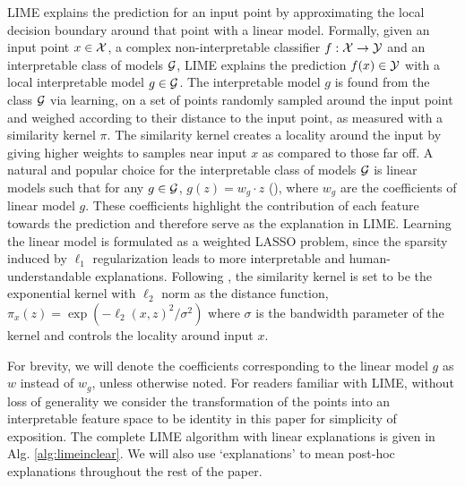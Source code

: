 LIME explains the prediction for an input point by approximating the local decision boundary around that point with a linear model. Formally, given an input point $x \in \mathcal{X}$, a complex non-interpretable classifier $f : \mathcal{X} \rightarrow \mathcal{Y}$ and an interpretable class of models $\mathcal{G}$, LIME explains the prediction $f(x) \in \mathcal{Y}$ with a local interpretable model $g \in \mathcal{G}$. The interpretable model $g$ is found from the class $\mathcal{G}$ via learning, on a set of points randomly sampled around the input point and weighed according to their distance to the input point, as measured with a similarity kernel $\pi$. The similarity kernel creates a locality around the input by giving higher weights to samples near input $x$ as compared to those far off. A natural and popular choice for the interpretable class of models $\mathcal{G}$ is linear models such that for any $g \in \mathcal{G}$, $g(z) = w_g \cdot z$ (\cite{ribeiro2016should, garreau2020looking}), where $w_g$ are the coefficients of linear model $g$. These coefficients highlight the contribution of each feature towards the prediction and therefore serve as the explanation in LIME. Learning the linear model is formulated as a weighted LASSO problem, since the sparsity induced by $\ell_1$ regularization leads to more interpretable and human-understandable explanations. Following \cite{ribeiro2016should}, the similarity kernel is set to be the exponential kernel with $\ell_2$ norm as the distance function, $\pi_x(z) = \exp \left(-\ell_2(x, z)^2 / \sigma^2\right)$ where $\sigma$ is the bandwidth parameter of the kernel and controls the locality around input $x$.

For brevity, we will denote the coefficients corresponding to the linear model $g$ as $w$ instead of $w_g$, unless otherwise noted. For readers familiar with LIME, without loss of generality we consider the transformation of the points into an interpretable feature space to be identity in this paper for simplicity of exposition. The complete LIME algorithm with linear explanations is given in Alg. \ref{alg:limeinclear}. We will also use `explanations' to mean post-hoc explanations throughout the rest of the paper.


    

